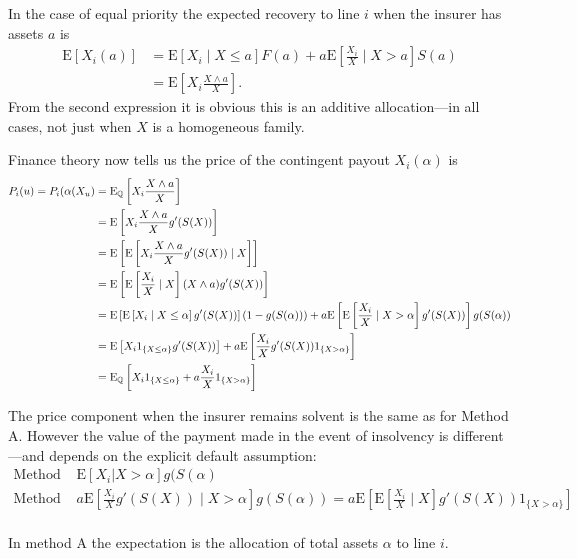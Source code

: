 In the case of equal priority the expected recovery to line \(i\) when
the insurer has assets \(a\) is \[
\begin{align}
\text{E}[X_i(a)] &= \text{E}[X_i \mid X \le a ]F(a) + a \text{E}\left[\frac{X_i}{X} \mid X > a \right] S(a) \\
&= \text{E}\left[ X_i\frac{X\wedge a}{X} \right].
\end{align}
\] From the second expression it is obvious this is an additive
allocation---in all cases, not just when \(X\) is a homogeneous family.

Finance theory now tells us the price of the contingent payout
\(X_i(\alpha)\) is \[
\begin{align}
P_i(u)=P_i(\alpha(X_u) &= \text{E}_{\Bbb{Q}}\left[  X_i\frac{X\wedge a}{X} \right] \\
&= \text{E}\left[  X_i\frac{X\wedge a}{X} g'(S(X)) \right] \\
&= \text{E}\left[ \text{E}\left[  X_i\frac{X\wedge a}{X} g'(S(X)) \mid X \right] \right] \\
&= \text{E}\left[ \text{E}\left[\frac{X_i}{X}\mid X \right] (X\wedge a) g'(S(X)) \right] \\
&= \text{E}\left[ \text{E}\left[ X_i \mid X \le \alpha \right] g'(S(X)) \right] (1-g(S(\alpha)))
    + a\text{E}\left[ \text{E}\left[\frac{X_i}{X}\mid X>\alpha \right] g'(S(X)) \right] g(S(\alpha)) \\
&= \text{E}\left[ X_i 1_{\{X \le \alpha \}} g'(S(X)) \right]
    + a\text{E}\left[ \frac{X_i}{X} g'(S(X)) 1_{\{ X>\alpha\}} \right] \\
&= \text{E}_{\Bbb{Q}}\left[ X_i 1_{\{X \le \alpha \}} + a \frac{X_i}{X} 1_{\{ X>\alpha\}} \right] \\
\end{align}
\]

The price component when the insurer remains solvent is the same as for
Method A. However the value of the payment made in the event of
insolvency is different---and depends on the explicit default
assumption: \[
\begin{align}
\text{Method A: } & \text{E}[X_i | X > \alpha]g(S(\alpha) \\
\text{Method B: } & a\text{E}\left[ \frac{X_i}{X} g'(S(X)) \mid X>\alpha \right] g(S(\alpha))
= a\text{E}\left[ \text{E}[\frac{X_i}{X} \mid X] g'(S(X)) 1_{\{ X>\alpha\}} \right] \\
\end{align}
\]

In method A the expectation is the allocation of total assets \(\alpha\)
to line \(i\).

